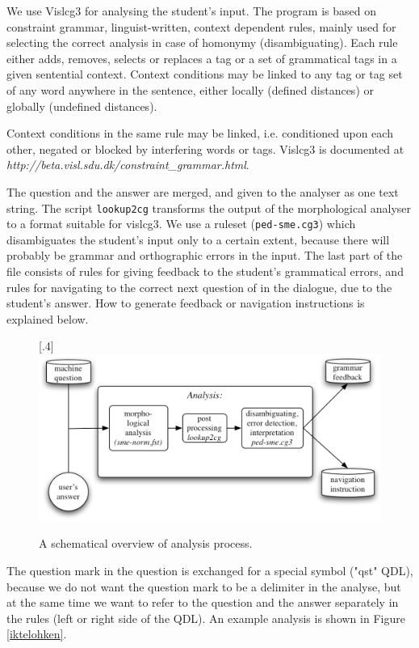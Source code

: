 \documentclass[a4paper,12pt]{article}
\begin{document}
We use Vislcg3 for analysing the student's input. The program is based on constraint grammar, linguist-written, context dependent rules, mainly used for selecting the correct analysis in case of homonymy (disambiguating). Each rule either adds, removes, selects or replaces a tag or a set of grammatical tags in a given sentential context. Context conditions may be linked to any tag or tag set of any word anywhere in the sentence, either locally (defined distances) or globally (undefined distances). 

Context conditions in the same rule may be linked, i.e. conditioned upon each other, negated or blocked by interfering words or tags. Vislcg3 is documented at \textit{http://beta.visl.sdu.dk/constraint\_grammar.html}.

The question and the answer are merged, and given to the analyser as one text string. The script \texttt{lookup2cg} transforms the output of the morphological analyser to a format suitable for vislcg3. We use a ruleset (\texttt{ped-sme.cg3}) which disambiguates the student's input only to a certain extent, because there will probably be grammar and orthographic errors in the input. The last part of the file consists of rules for giving feedback to the student's grammatical errors, and rules for navigating to the correct next question of in the dialogue, due to the student's answer. How to generate feedback or navigation instructions is explained below.


\begin{figure}[htbp]
\begin{center}
\scalebox{.4}[.4]{\includegraphics{img/qa.pdf}}
\caption{A schematical overview of analysis process.}
\label{qasystem}
\end{center}
\end{figure}

The question mark in the question is exchanged for a special symbol ("qst" QDL), because we do not want the question mark to be a delimiter in the analyse, but at the same time we want to refer to the question and the answer separately in the rules (left or right side of the QDL). An example analysis is shown in Figure \ref{iktelohken}.
\end{document}
